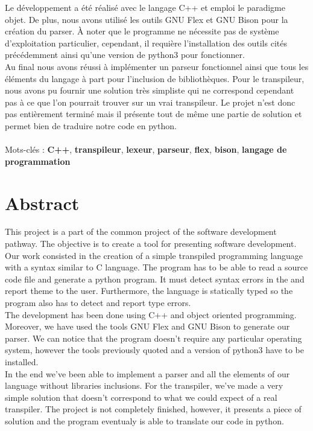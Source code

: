 \documentclass[a4paper]{article}%
\begin{document}
Le développement a été réalisé avec le langage C++ et emploi le paradigme objet.
De plus, nous avons utilisé les outils GNU Flex et GNU Bison pour la création du
\gls{parser}. À noter que le programme ne nécessite pas de système d'exploitation
particulier, cependant, il requière l'installation des outils cités précédemment
ainsi qu'une version de python3 pour fonctionner.\\ %

Au final nous avons réussi à implémenter un parseur fonctionnel ainsi que tous
les éléments du langage à part pour l'inclusion de bibliothèques. Pour le
transpileur, nous avons pu fournir une solution très simpliste qui ne correspond
cependant pas à ce que l'on pourrait trouver sur un vrai transpileur. Le projet
n'est donc pas entièrement terminé mais il présente tout de même une partie de
solution et permet bien de traduire notre code en python.
\\~\\

\noindent
Mots-clés : \textbf{C++}, \textbf{transpileur}, \textbf{lexeur}, \textbf{parseur},
\textbf{flex}, \textbf{bison},  \textbf{langage de programmation}

\section*{Abstract}

This project is a part of the common project of the software development
pathway. The objective is to create a tool for presenting software development.
Our work consisted in the creation of a simple transpiled programming language
with a syntax similar to C language. The program has to be able to read a source
code file and generate a python program. It must detect syntax errors in the and
report theme to the user. Furthermore, the language is statically typed so the
program also has to detect and report type errors.\\

The development has been done using C++ and object oriented programming.
Moreover, we have used the tools GNU Flex and GNU Bison to generate our parser.
We can notice that the program doesn't require any particular operating system,
however the tools previously quoted and a version of python3 have to be
installed.\\

In the end we've been able to implement a parser and all the elements of our
language without libraries inclusions. For the transpiler, we've made a very
simple solution that doesn't correspond to what we could expect of a real
transpiler. The project is not completely finished, however, it presents a piece
of solution and the program eventualy is able to translate our code in python.
\\~\\
\end{document}
